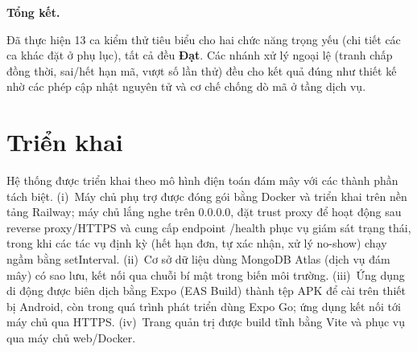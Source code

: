 \documentclass[../main.tex]{subfiles}%
\begin{document}
\begin{table}[H]
\centering
\renewcommand{\arraystretch}{1.25}
\caption{Ca kiểm thử chức năng ``Tìm và nhận thực phẩm''}
\label{tab:tc_nhan}
\end{table}

\textbf{Tổng kết.} 

Đã thực hiện 13 ca kiểm thử tiêu biểu cho hai chức năng trọng yếu (chi tiết các ca khác đặt ở phụ lục), tất cả đều \textbf{Đạt}. Các nhánh xử lý ngoại lệ (tranh chấp đồng thời, sai/hết hạn mã, vượt số lần thử) đều cho kết quả đúng như thiết kế nhờ các phép cập nhật nguyên tử và cơ chế chống dò mã ở tầng dịch vụ.

\section{Triển khai}
\label{section:4.5}

Hệ thống được triển khai theo mô hình điện toán đám mây với các thành phần tách biệt. (i)~Máy chủ phụ trợ được đóng gói bằng Docker và triển khai trên nền tảng Railway; máy chủ lắng nghe trên 0.0.0.0, đặt trust proxy để hoạt động sau reverse proxy/HTTPS và cung cấp endpoint /health phục vụ giám sát trạng thái, trong khi các tác vụ định kỳ (hết hạn đơn, tự xác nhận, xử lý no-show) chạy ngầm bằng setInterval. (ii)~Cơ sở dữ liệu dùng MongoDB Atlas (dịch vụ đám mây) có sao lưu, kết nối qua chuỗi bí mật trong biến môi trường. (iii)~Ứng dụng di động được biên dịch bằng Expo (EAS Build) thành tệp APK để cài trên thiết bị Android, còn trong quá trình phát triển dùng Expo Go; ứng dụng kết nối tới máy chủ qua HTTPS. (iv)~Trang quản trị được build tĩnh bằng Vite và phục vụ qua máy chủ web/Docker.
\end{document}
